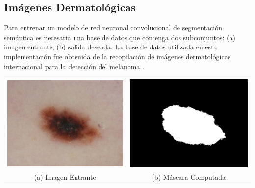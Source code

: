 \documentclass[a0,portrait]{a0poster}
\begin{document}
\begin{multicols}{3}
\section*{Imágenes Dermatológicas}
Para entrenar un modelo de red neuronal convolucional de segmentación semántica es necesaria una base de datos que contenga dos subconjuntos: (a) imagen entrante, (b) salida deseada. La base de datos utilizada en esta implementación fue obtenida de la recopilación de imágenes dermatológicas internacional para la detección del melanoma \citep{isic_skin}.

\begin{center}
    \begin{tabular}{c c}
    \includegraphics{input_1.png} &
    \includegraphics{mask_1.png} \\
    \small{(a) Imagen Entrante} & \small{(b) Máscara Computada}\\         
    \end{tabular}
\end{center}

\vspace{2cm}



\end{multicols}
\end{document}
